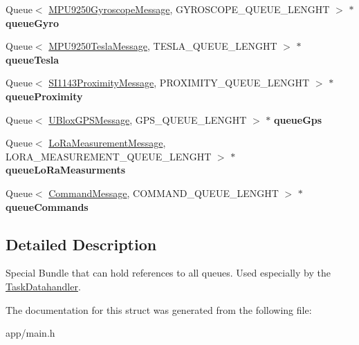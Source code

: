 \begin{DoxyCompactItemize}
\item 
\hypertarget{struct_queue_bundle_abad7c5a84acd22ce4bd9d5658bf8d403}{}Queue$<$ \hyperlink{class_m_p_u9250_gyroscope_message}{M\+P\+U9250\+Gyroscope\+Message}, G\+Y\+R\+O\+S\+C\+O\+P\+E\+\_\+\+Q\+U\+E\+U\+E\+\_\+\+L\+E\+N\+G\+H\+T $>$ $\ast$ {\bfseries queue\+Gyro}\label{struct_queue_bundle_abad7c5a84acd22ce4bd9d5658bf8d403}

\item 
\hypertarget{struct_queue_bundle_aeb81cef151b03071a8646454bb6f35ae}{}Queue$<$ \hyperlink{class_m_p_u9250_tesla_message}{M\+P\+U9250\+Tesla\+Message}, T\+E\+S\+L\+A\+\_\+\+Q\+U\+E\+U\+E\+\_\+\+L\+E\+N\+G\+H\+T $>$ $\ast$ {\bfseries queue\+Tesla}\label{struct_queue_bundle_aeb81cef151b03071a8646454bb6f35ae}

\item 
\hypertarget{struct_queue_bundle_a18f671467d8fa3b7d96bf49700d3a2cb}{}Queue$<$ \hyperlink{class_s_i1143_proximity_message}{S\+I1143\+Proximity\+Message}, P\+R\+O\+X\+I\+M\+I\+T\+Y\+\_\+\+Q\+U\+E\+U\+E\+\_\+\+L\+E\+N\+G\+H\+T $>$ $\ast$ {\bfseries queue\+Proximity}\label{struct_queue_bundle_a18f671467d8fa3b7d96bf49700d3a2cb}

\item 
\hypertarget{struct_queue_bundle_a7079f4a98e6f9d7bd49b7e79ff0ce9e6}{}Queue$<$ \hyperlink{class_u_blox_g_p_s_message}{U\+Blox\+G\+P\+S\+Message}, G\+P\+S\+\_\+\+Q\+U\+E\+U\+E\+\_\+\+L\+E\+N\+G\+H\+T $>$ $\ast$ {\bfseries queue\+Gps}\label{struct_queue_bundle_a7079f4a98e6f9d7bd49b7e79ff0ce9e6}

\item 
\hypertarget{struct_queue_bundle_a53448b177780d138ce7534b4b5304741}{}Queue$<$ \hyperlink{class_lo_ra_measurement_message}{Lo\+Ra\+Measurement\+Message}, L\+O\+R\+A\+\_\+\+M\+E\+A\+S\+U\+R\+E\+M\+E\+N\+T\+\_\+\+Q\+U\+E\+U\+E\+\_\+\+L\+E\+N\+G\+H\+T $>$ $\ast$ {\bfseries queue\+Lo\+Ra\+Measurments}\label{struct_queue_bundle_a53448b177780d138ce7534b4b5304741}

\item 
\hypertarget{struct_queue_bundle_a9f5de5919b8aa61c166d9e476b19f00e}{}Queue$<$ \hyperlink{class_command_message}{Command\+Message}, C\+O\+M\+M\+A\+N\+D\+\_\+\+Q\+U\+E\+U\+E\+\_\+\+L\+E\+N\+G\+H\+T $>$ $\ast$ {\bfseries queue\+Commands}\label{struct_queue_bundle_a9f5de5919b8aa61c166d9e476b19f00e}

\end{DoxyCompactItemize}


\subsection{Detailed Description}
Special Bundle that can hold references to all queues. Used especially by the \hyperlink{class_task_datahandler}{Task\+Datahandler}. 

The documentation for this struct was generated from the following file\+:\begin{DoxyCompactItemize}
\item 
app/main.\+h\end{DoxyCompactItemize}

